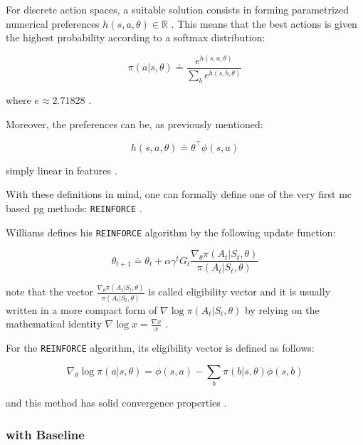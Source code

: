 \documentclass{seal_thesis}
\begin{document}
For discrete action spaces, a suitable solution consists in forming parametrized numerical preferences $h(s,a,\theta) \in \mathbb{R}$ \cite[p. 266]{Sutton2017}. This means that the best actions is given the highest probability according to a softmax distribution:

\begin{equation}
\label{eq:probabilistic_preferences}
	\pi(a|s,\theta) \doteq \frac{e^{h(s,a,\theta)}}{\sum_b e^{h(s,b,\theta)}}
\end{equation}

where $e \approx 2.71828$ \cite[p. 266]{Sutton2017}.

Moreover, the preferences can be, as previously mentioned:

\begin{equation}
\label{eq:dot_preferences}
	h(s,a,\theta) \doteq \theta^\top \phi (s,a)
\end{equation}

\ie simply linear in features \cite[p. 266]{Sutton2017}.

With these definitions in mind, one can formally define one of the very first \gls{mc} based \gls{pg} methods: \texttt{REINFORCE} \cite{Williams1992}.

Williams defines his \texttt{REINFORCE} algorithm by the following update function:

\begin{equation}
	\theta_{t+1} \doteq \theta_t + \alpha \gamma^t G_t \frac{\nabla_\theta \pi(A_t|S_t,\theta)}{\pi(A_t|S_t,\theta)}
\end{equation}

note that the vector $\frac{\nabla_\theta \pi(A_t|S_t,\theta)}{\pi(A_t|S_t,\theta)}$ is called eligibility vector and it is usually written in a more compact form of $\nabla \log \pi(A_t|S_t,\theta)$ by relying on the mathematical identity $\nabla \log x = \frac{\nabla x}{x}$ \cite[p. 271]{Sutton2017}.

For the \texttt{REINFORCE} algorithm, its eligibility vector is defined as follows:

\begin{equation}
	\nabla_\theta \log \pi (a|s,\theta) = \phi (s,a) - \sum_b \pi (b|s,\theta) \phi (s,b)
\end{equation}

and this method has solid convergence properties \cite[p. 271]{Sutton2017}.

\subsubsection{ with Baseline}
\end{document}
